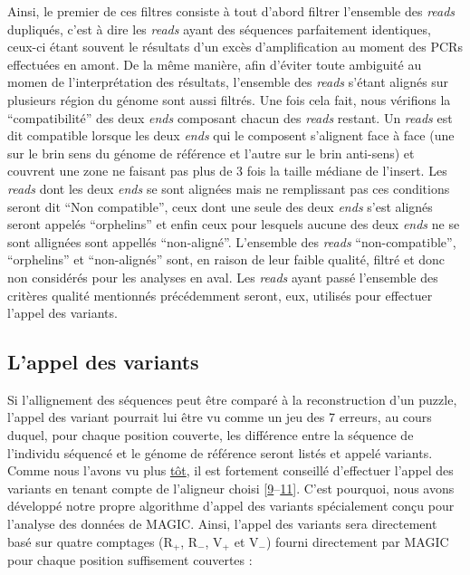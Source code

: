 \documentclass[12pt,twoside]{reedthesis}
\theoremstyle{definition}
\theoremstyle{definition}
\theoremstyle{remark}
\begin{document}
  Ainsi, le premier de ces filtres consiste à tout d'abord filtrer
  l'ensemble des \emph{reads} dupliqués, c'est à dire les \emph{reads}
  ayant des séquences parfaitement identiques, ceux-ci étant souvent le
  résultats d'un excès d'amplification au moment des PCRs effectuées en
  amont. De la même manière, afin d'éviter toute ambiguité au momen de
  l'interprétation des résultats, l'ensemble des \emph{reads} s'étant
  alignés sur plusieurs région du génome sont aussi filtrés. Une fois cela
  fait, nous vérifions la ``compatibilité'' des deux \emph{ends} composant
  chacun des \emph{reads} restant. Un \emph{reads} est dit compatible
  lorsque les deux \emph{ends} qui le composent s'alignent face à face
  (une sur le brin sens du génome de référence et l'autre sur le brin
  anti-sens) et couvrent une zone ne faisant pas plus de 3 fois la taille
  médiane de l'insert. Les \emph{reads} dont les deux \emph{ends} se sont
  alignées mais ne remplissant pas ces conditions seront dit ``Non
  compatible'', ceux dont une seule des deux \emph{ends} s'est alignés
  seront appelés ``orphelins'' et enfin ceux pour lesquels aucune des deux
  \emph{ends} ne se sont allignées sont appellés ``non-aligné''.
  L'ensemble des \emph{reads} ``non-compatible'', ``orphelins'' et
  ``non-alignés'' sont, en raison de leur faible qualité, filtré et donc
  non considérés pour les analyses en aval. Les \emph{reads} ayant passé
  l'ensemble des critères qualité mentionnés précédemment seront, eux,
  utilisés pour effectuer l'appel des variants.
  
  \newpage
  
  \subsection{L'appel des variants}\label{lappel-des-variants}
  
  Si l'allignement des séquences peut être comparé à la reconstruction
  d'un puzzle, l'appel des variant pourrait lui être vu comme un jeu des 7
  erreurs, au cours duquel, pour chaque position couverte, les différence
  entre la séquence de l'individu séquencé et le génome de référence
  seront listés et appelé variants. Comme nous l'avons vu plus
  \protect\hyperlink{varcall}{tôt}, il est fortement conseillé d'effectuer
  l'appel des variants en tenant compte de l'aligneur choisi
  {[}\protect\hyperlink{ref-Nielsen2011}{9}--\protect\hyperlink{ref-Lunter2011}{11}{]}.
  C'est pourquoi, nous avons développé notre propre algorithme d'appel des
  variants spécialement conçu pour l'analyse des données de MAGIC. Ainsi,
  l'appel des variants sera directement basé sur quatre comptages
  (R\(_+\), R\(_-\), V\(_+\) et V\(_-\)) fourni directement par MAGIC pour
  chaque position suffisement couvertes :
  
\end{document}
